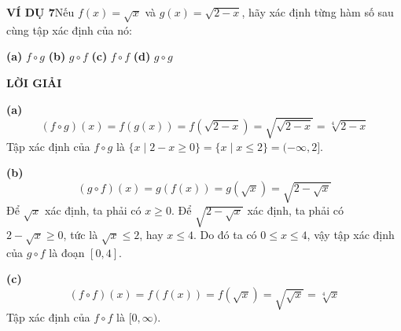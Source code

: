 \begin{minipage}[t]{0.708\textwidth}
    \vspace{6pt}
    \noindent\textbf{\textsf{\color{stewartcyan}VÍ DỤ 7}}\quad Nếu $f(x) = \sqrt{x}$ và $g(x) = \sqrt{2 - x}$, hãy xác định từng hàm số sau cùng tập xác định của nó:
    \begin{center}
        \textbf{(a)}\; $f \circ g$ \qquad\qquad \textbf{(b)}\; $g \circ f$ \qquad\qquad \textbf{(c)}\; $f \circ f$ \qquad\qquad \textbf{(d)}\; $g \circ g$
    \end{center}

    \vspace{-2pt}
    \noindent\textbf{\textsf{\color{stewartcyan}LỜI GIẢI}}

    \noindent\textbf{(a)}\;
    \[
    (f \circ g)(x) = f(g(x)) = f(\sqrt{2 - x}) = \sqrt{\sqrt{2 - x}} = \sqrt[4]{2 - x}
    \]
    Tập xác định của $f \circ g$ là $\{x \mid 2 - x \geqslant 0\} = \{x \mid x \leqslant 2\} = (-\infty, 2]$.

    \vspace{3pt}
    \noindent\textbf{(b)}\;
    \[
    (g \circ f)(x) = g(f(x)) = g(\sqrt{x}) = \sqrt{2 - \sqrt{x}}
    \]
    Để $\sqrt{x}$ xác định, ta phải có $x \geqslant 0$. Để $\sqrt{2 - \sqrt{x}}$ xác định, ta phải có $2 - \sqrt{x} \geqslant 0$, tức là $\sqrt{x} \leqslant 2$, hay $x \leqslant 4$. Do đó ta có $0 \leqslant x \leqslant 4$, vậy tập xác định của $g \circ f$ là đoạn $[0, 4]$.

    \vspace{3pt}
    \noindent\textbf{(c)}\;
    \[
    (f \circ f)(x) = f(f(x)) = f(\sqrt{x}) = \sqrt{\sqrt{x}} = \sqrt[4]{x}
    \]
    Tập xác định của $f \circ f$ là $[0, \infty)$.
\end{minipage}